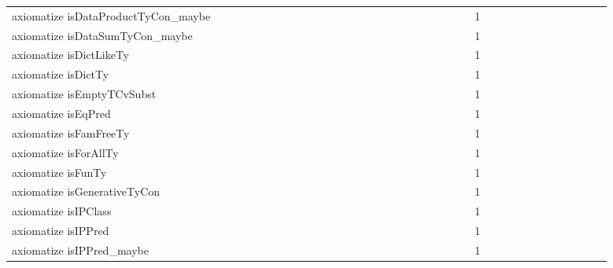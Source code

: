 {\begin{tabular}{l|rrr|rrr|rrr}
axiomatize isDataProductTyCon_maybe &  &  &  &  &  &  &  &  &  &  &  &  &  &  &  &  &  &  &  &  &  &  &  & 1 &  &  &  &  &  &  &  &  &  &  &  & \\
axiomatize isDataSumTyCon_maybe &  &  &  &  &  &  &  &  &  &  &  &  &  &  &  &  &  &  &  &  &  &  &  & 1 &  &  &  &  &  &  &  &  &  &  &  & \\
axiomatize isDictLikeTy &  &  &  &  &  &  &  &  &  &  &  &  &  &  &  &  &  &  &  &  &  &  &  & 1 &  &  &  &  &  &  &  &  &  &  &  & \\
axiomatize isDictTy &  &  &  &  &  &  &  &  &  &  &  &  &  &  &  &  &  &  &  &  &  &  &  & 1 &  &  &  &  &  &  &  &  &  &  &  & \\
axiomatize isEmptyTCvSubst &  &  &  &  &  &  &  &  &  &  &  &  &  &  &  &  &  &  &  &  &  &  &  & 1 &  &  &  &  &  &  &  &  &  &  &  & \\
axiomatize isEqPred &  &  &  &  &  &  &  &  &  &  &  &  &  &  &  &  &  &  &  &  &  &  &  & 1 &  &  &  &  &  &  &  &  &  &  &  & \\
axiomatize isFamFreeTy &  &  &  &  &  &  &  &  &  &  &  &  &  &  &  &  &  &  &  &  &  &  &  & 1 &  &  &  &  &  &  &  &  &  &  &  & \\
axiomatize isForAllTy &  &  &  &  &  &  &  &  &  &  &  &  &  &  &  &  &  &  &  &  &  &  &  & 1 &  &  &  &  &  &  &  &  &  &  &  & \\
axiomatize isFunTy &  &  &  &  &  &  &  &  &  &  &  &  &  &  &  &  &  &  &  &  &  &  &  & 1 &  &  &  &  &  &  &  &  &  &  &  & \\
axiomatize isGenerativeTyCon &  &  &  &  &  &  &  &  &  &  &  &  &  &  &  &  &  &  &  &  &  &  &  & 1 &  &  &  &  &  &  &  &  &  &  &  & \\
axiomatize isIPClass &  &  &  &  &  &  &  &  &  &  &  &  &  &  &  &  &  &  &  &  &  &  &  & 1 &  &  &  &  &  &  &  &  &  &  &  & \\
axiomatize isIPPred &  &  &  &  &  &  &  &  &  &  &  &  &  &  &  &  &  &  &  &  &  &  &  & 1 &  &  &  &  &  &  &  &  &  &  &  & \\
axiomatize isIPPred_maybe &  &  &  &  &  &  &  &  &  &  &  &  &  &  &  &  &  &  &  &  &  &  &  & 1 &  &  &  &  &  &  &  &  &  &  &  & \\

\end{tabular}}

